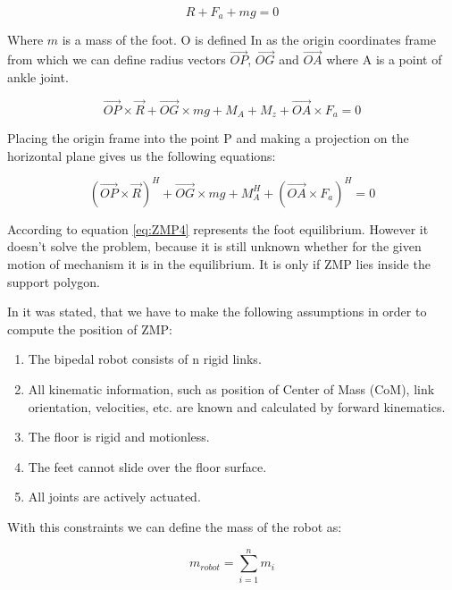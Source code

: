 \documentclass[12pt,a4paper]{report}
\begin{document}
		\begin{equation}\label{eq:ZMP2}
			R + F_a + mg = 0
		\end{equation}

		Where $m$ is a mass of the foot. O is defined In \cite{vukobratovic2004zero} as the origin coordinates frame from which we can define radius vectors $\vec{OP}$, $\vec{OG}$ and $\vec{OA}$ where A is a point of ankle joint.

		\begin{equation}\label{eq:ZMP3}
			\vec{OP} \times \vec{R} + \vec{OG} \times mg + M_A + M_z + \vec{OA} \times F_a = 0
		\end{equation}

		Placing the origin frame into the point P and making a projection on the horizontal plane gives us the following equations: 

		\begin{equation}\label{eq:ZMP4}
			(\vec{OP} \times \vec{R})^H + \vec{OG} \times mg + M_A^H + (\vec{OA} \times F_a)^H = 0
		\end{equation}

		According to \cite{vukobratovic2004zero} equation \ref{eq:ZMP4} represents the foot equilibrium. However it doesn't solve the problem, because it is still unknown whether for the given motion of mechanism it is in the equilibrium. It is only if ZMP lies inside the support polygon.
		
		In \cite{dekker2009zero} it was stated, that we have to make the following assumptions in order to compute the position of ZMP:

		\begin{enumerate}
			\item
				The bipedal robot consists of n rigid links.
			\item
				All kinematic information, such as position of Center of Mass (CoM), link orientation, velocities, etc. are known and calculated by forward kinematics.
			\item
				The floor is rigid and motionless.
			\item
				The feet cannot slide over the floor surface.
			\item
				All joints are actively actuated.
		\end{enumerate}
	
		With this constraints we can define the mass of the robot as:
	
		\begin{equation}\label{eq:ZMP5}
			m_{robot} = \sum^n_{i=1}{m_i}
		\end{equation}
\end{document}
